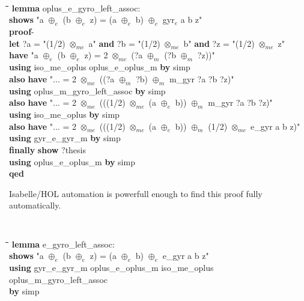 \documentclass[a4paper]{article}
\theoremstyle{definition}
\begin{document}
{\tt
\begin{small}
\begin{tabbing}
  \hspace{3mm}\=\hspace{3mm}\=\hspace{3mm}\=\hspace{3mm}\=\kill
{\bf lemma} oplus\_e\_gyro\_left\_assoc:\\
\>  {\bf shows} "a $\oplus_e$ (b $\oplus_e$ z) = (a $\oplus_e$ b) $\oplus_e$ gyr$_e$ a b z"\\
{\bf proof}-\\
\>  {\bf let} ?a = "(1/2) $\otimes_{me}$ a" {\bf and} ?b = "(1/2) $\otimes_{me}$ b" {\bf and} ?z = "(1/2) $\otimes_{me}$ z"\\
\>  {\bf have} "a $\oplus_e$ (b $\oplus_e$ z) = 2 $\otimes_{me}$ (?a $\oplus_m$ (?b $\oplus_m$ ?z))"\\
\>\>    {\bf using} iso\_me\_oplus oplus\_e\_oplus\_m {\bf by} simp\\
\>  {\bf also} {\bf have} "$\ldots$ = 2 $\otimes_{me}$ ((?a $\oplus_m$ ?b) $\oplus_m$ m\_gyr ?a ?b ?z)"\\
\>\>    {\bf using} oplus\_m\_gyro\_left\_assoc {\bf by} simp\\
\>  {\bf also} {\bf have} "$\ldots$ = 2 $\otimes_{me}$ (((1/2) $\otimes_{me}$ (a $\oplus_e$ b)) $\oplus_m$ m\_gyr ?a ?b ?z)"\\
\>\>    {\bf using} iso\_me\_oplus {\bf by} simp\\
\>  {\bf also} {\bf have} "$\ldots$ = 2 $\otimes_{me}$ (((1/2) $\otimes_{me}$ (a $\oplus_e$ b)) $\oplus_m$ (1/2) $\otimes_{me}$ e\_gyr a b z)"\\
\>\>    {\bf using} gyr\_e\_gyr\_m {\bf by} simp\\
\>  {\bf finally} {\bf show} ?thesis\\
\>\>    {\bf using} oplus\_e\_oplus\_m {\bf by} simp\\
{\bf qed}
\end{tabbing}
\end{small}
}

Isabelle/HOL automation is powerfull enough to find this proof fully
automatically.

{\tt
\begin{small}
\begin{tabbing}
  \hspace{2mm}\=\hspace{3mm}\=\hspace{3mm}\=\hspace{3mm}\=\kill
{\bf lemma} e\_gyro\_left\_assoc:\\
\>  {\bf shows} "a $\oplus_e$ (b $\oplus_e$ z) = (a $\oplus_e$ b) $\oplus_e$ e\_gyr a b z"\\
{\bf using} gyr\_e\_gyr\_m oplus\_e\_oplus\_m iso\_me\_oplus oplus\_m\_gyro\_left\_assoc\\
{\bf by} simp
\end{tabbing}
\end{small}
}
\end{document}

